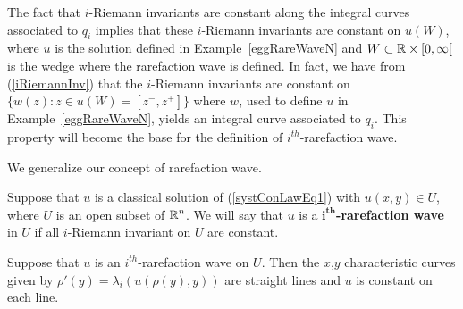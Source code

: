 \begin{egg}
The fact that $i$-Riemann invariants are constant along the integral
curves associated to $q_i$ implies that these $i$-Riemann invariants
are constant on $u(W)$, where $u$ is the solution defined in
Example~\ref{eggRareWaveN} and $W \subset \mathbb{R}\times [0,\infty[$ is the
wedge where the rarefaction wave is defined.
In fact, we have from (\ref{iRiemannInv}) that the $i$-Riemann invariants are
constant on $\{ w(z) : z \in u(W) = [z^-,z^+]\}$ where $w$, used to
define $u$ in Example~\ref{eggRareWaveN}, yields an integral
curve associated to $q_i$.
This property will become the base for the definition of 
$\displaystyle i^{th}$-rarefaction wave.
\end{egg}

We generalize our concept of rarefaction wave.

\begin{defn}
Suppose that $u$ is a classical solution of (\ref{systConLawEq1}) with
$u(x,y) \in U$, where $U$ is an open subset of $\displaystyle \mathbb{R}^n$.
We will say that $u$ is a
{\bfseries $\displaystyle \mathbf{i^{th}}$-rarefaction
wave}
in $U$ if all $i$-Riemann invariant on $U$ are constant.
\end{defn}

\begin{prop}
Suppose that $u$ is an $\displaystyle i^{th}$-rarefaction wave on $U$.
Then the $x$,$y$ characteristic curves given by
$\rho'(y) = \lambda_i(u(\rho(y),y))$  
are straight lines and $u$ is constant on each line.
\end{prop}

